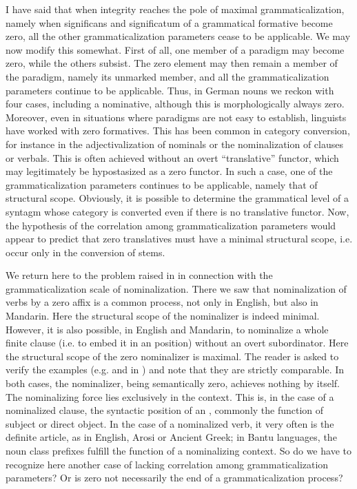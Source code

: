 I have said that when integrity reaches the pole of maximal grammaticalization, namely when significans and significatum of a grammatical formative become zero, all the other grammaticalization parameters cease to be applicable. We may now modify this somewhat. First of all, one member of a paradigm may become zero, while the others subsist. The zero element may then remain a member of the paradigm, namely its unmarked member, and all the grammaticalization parameters continue to be applicable. Thus, in German nouns we reckon with four cases, including a nominative, although this is morphologically always zero. Moreover, even in situations where paradigms are not easy to establish, linguists have worked with zero formatives. This has been common in category conversion, for instance in the adjectivalization of nominals or the nominalization of clauses or verbals. This is often achieved without an overt ``translative'' functor, which may legitimately be hypostasized as a zero functor. In such a case, one of the grammaticalization parameters continues to be applicable, namely that of structural scope. Obviously, it is possible to determine the grammatical level of a syntagm whose category is converted even if there is no translative functor. Now, the hypothesis of the correlation among grammaticalization parameters would appear to predict that zero translatives must have a minimal structural scope, i.e. occur only in the conversion of stems.

We return here to the problem raised in  in connection with the grammaticalization scale of nominalization. There we saw that nominalization of verbs by a zero affix is a common process, not only in English, but also in Mandarin. Here the structural scope of the nominalizer is indeed minimal. However, it is also possible, in English and Mandarin, to nominalize a whole finite clause (i.e. to embed it in an \np position) without an overt subordinator. Here the structural scope of the zero nominalizer is maximal. The reader is asked to verify the examples (e.g.  and  in ) and note that they are strictly comparable. In both cases, the nominalizer, being semantically zero, achieves nothing by itself. The nominalizing force lies exclusively in the context. This is, in the case of a nominalized clause, the syntactic position of an \np, commonly the function of subject or direct object. In the case of a nominalized verb, it very often is the definite article, as in English, Arosi or Ancient Greek; in Bantu languages, the noun class prefixes fulfill the function of a nominalizing context. So do we have to recognize here another case of lacking correlation among grammaticalization parameters? Or is zero not necessarily the end of a grammaticalization process?

